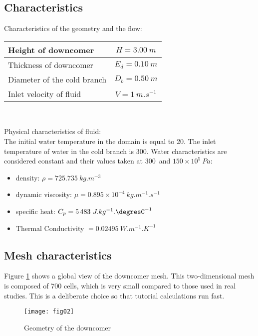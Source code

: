         \subsection{Characteristics}

Characteristics of the geometry and the flow:
\begin{center}
\begin{tabular}{|l|c|}
\hline
Height of downcomer & $H = 3.00\ m$ \\
\hline
Thickness of downcomer & $E_{d} = 0.10\ m$ \\
\hline
Diameter of the cold branch & $D_{b} = 0.50\ m$ \\
\hline
Inlet velocity of fluid & $V = 1\ m.s^{-1}$ \\
\hline
\end{tabular}\\
\end{center}

Physical characteristics of fluid:\\
The initial water temperature in the domain is equal to 20\degresC.
The inlet temperature of water in the cold branch is 300\degresC.
Water characteristics are considered constant and their values taken at
300\degresC\ and $150\times 10^{5}\ Pa$:
\begin{itemize}
        \item density: $\rho = 725.735\ kg.m^{-3}$
        \item dynamic viscosity: $\mu = 0.895\times10^{-4}\ kg.m^{-1}.s^{-1}$
        \item specific heat: $C_{p} = 5\,483\ J.kg^{-1}.\mbox{\degresC}^{-1}$
        \item Thermal Conductivity $ = 0.02495\ W.m^{-1}.K^{-1}$
\end{itemize}


        \subsection{Mesh characteristics}

Figure \ref{figante12} shows a global view of the downcomer mesh. This
two-dimensional mesh is composed
of 700 cells, which is very small compared to those used in real
studies. This is
a deliberate choice so that tutorial calculations run fast.

\begin{figure}[h!]
\begin{center}
\texttt{[image: fig02]}
\caption{Geometry of the downcomer}
\label{figante12}
\end{center}
\end{figure}

